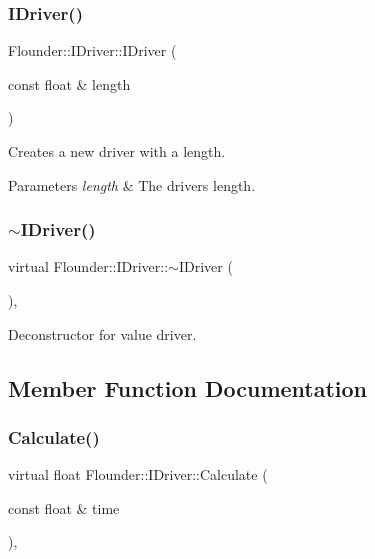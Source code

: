 \subsubsection{\texorpdfstring{I\+Driver()}{IDriver()}}
{\footnotesize\ttfamily Flounder\+::\+I\+Driver\+::\+I\+Driver (\begin{DoxyParamCaption}\item[{const float \&}]{length }\end{DoxyParamCaption})\hspace{0.3cm}{\ttfamily [inline]}}



Creates a new driver with a length. 


\begin{DoxyParams}{Parameters}
{\em length} & The drivers length. \\
\hline
\end{DoxyParams}
\mbox{\label{class_flounder_1_1_i_driver_a3cca0f4835cbb3ea6ad9388bd41392f6}} 
\subsubsection{\texorpdfstring{$\sim$\+I\+Driver()}{~IDriver()}}
{\footnotesize\ttfamily virtual Flounder\+::\+I\+Driver\+::$\sim$\+I\+Driver (\begin{DoxyParamCaption}{ }\end{DoxyParamCaption})\hspace{0.3cm}{\ttfamily [inline]}, {\ttfamily [virtual]}}



Deconstructor for value driver. 



\subsection{Member Function Documentation}
\mbox{\label{class_flounder_1_1_i_driver_a969f0c8da089f9d17129ee12b40c354a}} 
\subsubsection{\texorpdfstring{Calculate()}{Calculate()}}
{\footnotesize\ttfamily virtual float Flounder\+::\+I\+Driver\+::\+Calculate (\begin{DoxyParamCaption}\item[{const float \&}]{time }\end{DoxyParamCaption})\hspace{0.3cm}{\ttfamily [protected]}, {}}



